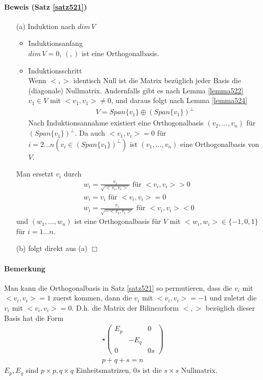 \paragraph{Beweis (Satz \ref{satz521})}
\begin{itemize}
\item[(a)] Induktion nach $dim\, V$
\begin{itemize}
\item \f{Induktionsanfang} \\
$dim\, V = 0$, $(,)$ ist eine Orthogonalbasis.
\item \f{Induktionsschritt} \\
Wenn $<, >$ identisch Null ist die Matrix bezüglich jeder Basis die (diagonale) Nullmatrix.
Andernfalls gibt es nach Lemma \ref{lemma522} $v_1 \in V$ mit $<v_1, v_1> \neq 0$, und daraus folgt nach Lemma \ref{lemma524}
\begin{align}
V = Span \{v_1\} \oplus (Span\{v_1\})^{\perp}
\end{align}
Nach Induktionsannahme existiert eine Orthogonalbasis $(v_2, ..., v_n)$ für $(Span\{v_1\})^{\perp}$. Da auch $<v_1, v_i> = 0$ für $i = 2...n (v_i \in (Span\{v_1\})^{\perp})$ ist $(v_1, ..., v_n)$ eine Orthogonalbasis von $V$.\\
\end{itemize}
Man ersetzt $v_i$ durch
\begin{align}
w_i = \frac{v_i}{\sqrt{<v_i, v_i>}} \text{ für } <v_i, v_i> > 0 \\
w_i = v_i \text{ für } <v_i, v_i> = 0 \\
w_i = \frac{v_i}{\sqrt{-<v_i, v_i>}} \text{ für } <v_i, v_i> < 0
\end{align}
und $(w_1, ..., w_n)$ ist eine Orthogonalbasis für $V$ mit $<w_i, w_i> \in \{-1, 0, 1\}$ für $i = 1...n$.
\item[(b)] folgt direkt aus (a) \hfill $\Box$
\end{itemize}

\paragraph{Bemerkung}
Man kann die Orthogonalbasis in Satz \ref{satz521} so permutieren, dass die $v_i$ mit $<v_i, v_i> = 1$ zuerst kommen, dann die $v_i$ mit $<v_i, v_i> = -1$ und zuletzt die $v_i$ mit $<v_i, v_i> = 0$. D.h. die Matrix der Bilinearform $<, >$ bezüglich dieser Basis hat die Form
\begin{align}
\star \begin{pmatrix} E_p & & 0 \\ & -E_q & \\ 0 & & 0s\end{pmatrix} \\
p + q + s = n
\end{align}
$E_p, E_q$ sind $p \times p, q \times q$ Einheitsmatrizen, $0s$ ist die $s \times s$ Nullmatrix.

